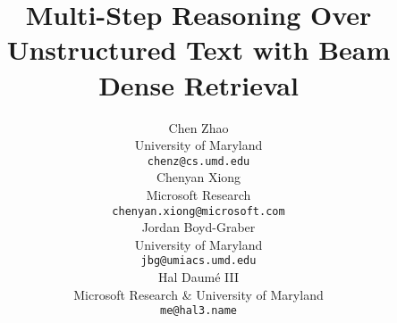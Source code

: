 \documentclass[11pt,a4paper]{article}
\title{Multi-Step Reasoning Over Unstructured Text with Beam Dense Retrieval}
\author{
  Chen Zhao\\
  University of Maryland\\
  {\tt chenz@cs.umd.edu} \\\And
  Chenyan Xiong\\
  Microsoft Research\\
  {\tt chenyan.xiong@microsoft.com} \\\AND
  Jordan Boyd-Graber\\
  University of Maryland\\
  {\tt jbg@umiacs.umd.edu} \\\And
  Hal Daum{\'e} III\\
  Microsoft Research \& University of Maryland\\
  {\tt me@hal3.name} \\}
\date{}
\newif\ifdoublespaceme
\newcommand{\latexfile}[1]{}
\begin{document}
\maketitle


\ifdoublespaceme
  \doublespacing
\fi


\begin{abstract}
  \latexfile{00-abstract}

\end{abstract}



\latexfile{10-intro}
\latexfile{30-model}
\latexfile{50-experiment}
\latexfile{60-analysis}
\latexfile{70-related}
\latexfile{80-conclusion}
\latexfile{90-ack}

\clearpage






\end{document}
